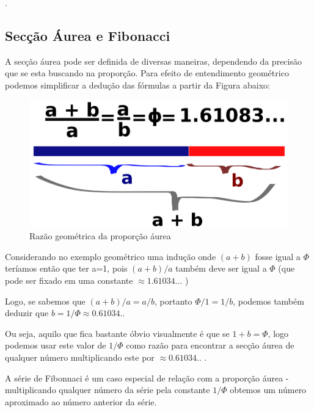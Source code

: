 \documentclass[
	12pt,				%
	openright,			%
	twoside,			%
	a4paper,			%
	english,			%
	french,				%
	spanish,			%
	brazil				%
	]{abntex2}
\begin{document}

.




\pagebreak
\subsection{Secção Áurea e Fibonacci}

A secção áurea pode ser definida de diversas maneiras, dependendo da precisão que se esta buscando na proporção. Para efeito de entendimento geométrico podemos simplificar a dedução das fórmulas a partir da Figura abaixo: 

\begin{figure}[!h]
	\caption{\label{fig_grafico}Razão geométrica da proporção áurea }
	\begin{center}
	    \includegraphics[scale=0.25]{axis/proportionaurea.png}
	\end{center}
\end{figure}	


Considerando no exemplo geométrico uma indução onde $(a+b)$ fosse igual a $\Phi$ teríamos então que ter a=1, pois $(a+b)/a$ também deve ser igual a $\Phi$ (que pode ser fixado em uma constante  $ \approx 1.61034... $ ) 

Logo, se sabemos que $(a+b)/a = a/b $, portanto $\Phi/1 = 1/b$, podemos também deduzir que $b = 1/\Phi \approx 0.61034.. $ 

Ou seja, aquilo que fica bastante óbvio visualmente é que se $1+b = \Phi$, logo podemos usar este valor de $1/\Phi$ como razão para encontrar a secção áurea de qualquer número multiplicando este por $ \approx 0.61034.. $ .

A série de Fibonnaci é um caso especial de relação com a proporção áurea - multiplicando qualquer número da série pela constante $1/\Phi$ obtemos um número aproximado ao número anterior da série.
\end{document}
